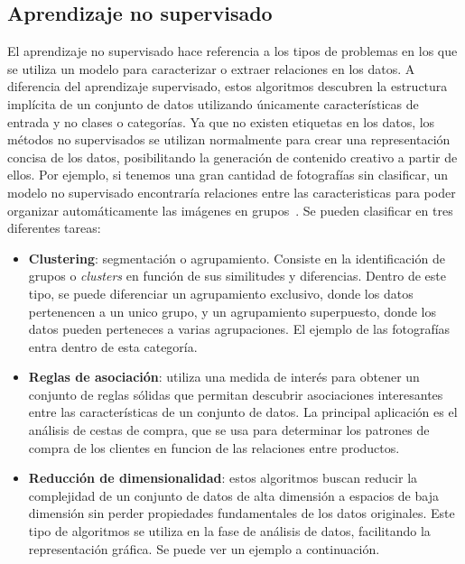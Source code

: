 \subsection{Aprendizaje no supervisado}
El aprendizaje no supervisado hace referencia a los tipos de problemas en los que se utiliza un modelo para caracterizar o extraer relaciones en los datos.
A diferencia del aprendizaje supervisado, estos algoritmos descubren la estructura implícita de un conjunto de datos utilizando únicamente características de entrada y no clases o categorías. 
Ya que no existen etiquetas en los datos, los métodos no supervisados se utilizan normalmente para crear una representación concisa de los datos, posibilitando la generación de contenido creativo a partir de ellos. Por ejemplo, si tenemos una gran cantidad de fotografías sin clasificar, un modelo no supervisado encontraría relaciones entre las caracteristicas para poder organizar automáticamente las imágenes en grupos~\cite{USL:guide}.
Se pueden clasificar en tres diferentes tareas:
\begin{itemize}
	\item \textbf{Clustering}: segmentación o agrupamiento. Consiste en la identificación de grupos o \textit{clusters} en función de sus similitudes y diferencias. Dentro de este tipo, se puede diferenciar un agrupamiento exclusivo, donde los datos pertenencen a un unico grupo, y un agrupamiento superpuesto, donde los datos pueden perteneces a varias agrupaciones. El ejemplo de las fotografías entra dentro de esta categoría.
	\item \textbf{Reglas de asociación}: utiliza una medida de interés para obtener un conjunto de reglas sólidas que permitan descubrir asociaciones interesantes entre las características de un conjunto de datos. La principal aplicación es el \guillemetleft análisis de cestas de compra\guillemetright, que se usa para determinar los patrones de compra de los clientes en funcion de las relaciones entre productos.
	\item \textbf{Reducción de dimensionalidad}: estos algoritmos buscan reducir la complejidad de un conjunto de datos de alta dimensión a espacios de baja dimensión sin perder propiedades fundamentales de los datos originales. Este tipo de algoritmos se utiliza en la fase de análisis de datos, facilitando la representación gráfica. Se puede ver un ejemplo a continuación.
\end{itemize}





